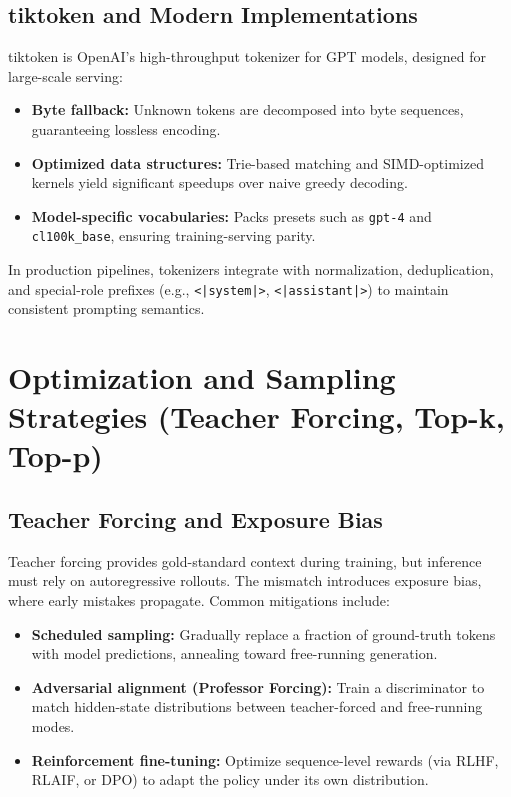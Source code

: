 \documentclass{article}
\begin{document}
\subsection{tiktoken and Modern Implementations}
tiktoken is OpenAI's high-throughput tokenizer for GPT models, designed for large-scale serving:
\begin{itemize}
  \item \textbf{Byte fallback:} Unknown tokens are decomposed into byte sequences, guaranteeing lossless encoding.
  \item \textbf{Optimized data structures:} Trie-based matching and SIMD-optimized kernels yield significant speedups over naive greedy decoding.
  \item \textbf{Model-specific vocabularies:} Packs presets such as \texttt{gpt-4} and \texttt{cl100k\_base}, ensuring training-serving parity.
\end{itemize}
In production pipelines, tokenizers integrate with normalization, deduplication, and special-role prefixes (e.g., \texttt{<|system|>}, \texttt{<|assistant|>}) to maintain consistent prompting semantics.

\section{Optimization and Sampling Strategies (Teacher Forcing, Top-k, Top-p)}
\subsection{Teacher Forcing and Exposure Bias}
Teacher forcing provides gold-standard context during training, but inference must rely on autoregressive rollouts. The mismatch introduces exposure bias, where early mistakes propagate. Common mitigations include:
\begin{itemize}
  \item \textbf{Scheduled sampling:} Gradually replace a fraction of ground-truth tokens with model predictions, annealing toward free-running generation.
  \item \textbf{Adversarial alignment (Professor Forcing):} Train a discriminator to match hidden-state distributions between teacher-forced and free-running modes.
  \item \textbf{Reinforcement fine-tuning:} Optimize sequence-level rewards (via RLHF, RLAIF, or DPO) to adapt the policy under its own distribution.
\end{itemize}
\end{document}
